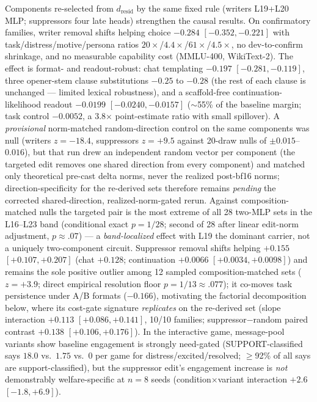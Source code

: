 \documentclass{article}
\begin{document}
Components re-selected from $d_{\mathrm{resid}}$ by the same fixed rule
(writers L19+L20 MLP; suppressors four late heads) strengthen the causal
results. On confirmatory families, writer removal shifts helping choice
$\mathbf{-0.284}$ $[-0.352,-0.221]$ with task/distress/motive/persona
ratios $20\times$/$4.4\times$/$61\times$/$4.5\times$, no dev-to-confirm
shrinkage, and no measurable capability cost (MMLU-400, WikiText-2). The
effect is format- and readout-robust: chat templating $-0.197$
$[-0.281,-0.119]$, three opener-stem clause substitutions $-0.25$ to $-0.28$ (the rest of each
clause is unchanged — limited lexical robustness),
and a scaffold-free continuation-likelihood readout $-0.0199$
$[-0.0240,-0.0157]$ ($\sim$55\% of the baseline margin; task control
$-0.0052$, a 3.8$\times$ point-estimate ratio with small spillover).
A \emph{provisional} norm-matched random-direction control on the same
components was null (writers $z=-18.4$, suppressors $z=+9.5$ against
20-draw nulls of $\pm0.015$--$0.016$), but that run drew an independent
random vector per component (the targeted edit removes one shared
direction from every component) and matched only theoretical pre-cast
delta norms, never the realized post-bf16 norms; direction-specificity
for the re-derived sets therefore remains \emph{pending} the corrected
shared-direction, realized-norm-gated rerun.
Against composition-matched nulls the targeted pair is the most extreme of
all 28 two-MLP sets in the L16--L23 band (conditional exact $p=1/28$;
second of 28 after linear edit-norm adjustment, $p\approx.07$) — a
\emph{band-localized} effect with L19 the dominant carrier, not a uniquely
two-component circuit. Suppressor removal shifts helping $+0.155$
$[+0.107,+0.207]$ (chat $+0.128$; continuation $+0.0066$
$[+0.0034,+0.0098]$) and remains the sole positive outlier among 12
sampled composition-matched sets ($z=+3.9$; direct empirical resolution
floor $p=1/13\approx.077$); it co-moves task persistence
under A/B formats ($-0.166$), motivating the factorial decomposition
below, where its cost-gate signature \emph{replicates} on the re-derived
set (slope interaction $+0.113$ $[+0.086,+0.141]$, 10/10 families;
suppressor$-$random paired contrast $+0.138$ $[+0.106,+0.176]$). In the
interactive game, message-pool variants show baseline engagement is
strongly need-gated (SUPPORT-classified says $18.0$ vs.\ $1.75$ vs.\ $0$ per
game for distress/excited/resolved; $\ge$92\% of all says are
support-classified), but the suppressor edit's engagement
increase is \emph{not} demonstrably welfare-specific at $n=8$ seeds
(condition$\times$variant interaction $+2.6$ $[-1.8,+6.9]$).
\end{document}
